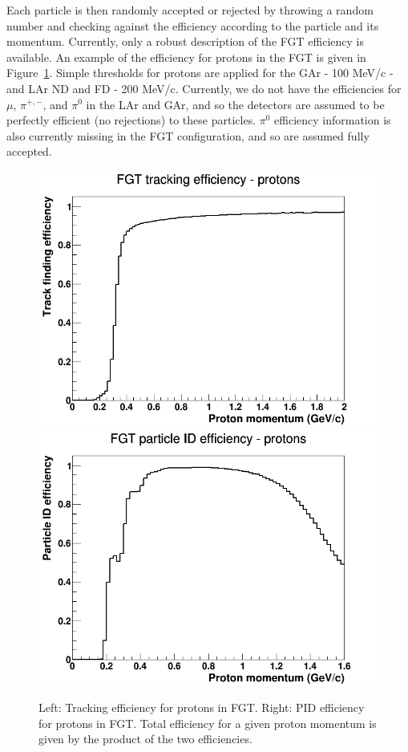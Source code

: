 \documentclass[12pt]{article}
\begin{document}
\FloatBarrier

Each particle is then randomly accepted or rejected by throwing a random number and checking against the efficiency according to the particle and its momentum. Currently, only a robust description of the FGT efficiency is available. An example of the efficiency for protons in the FGT is given in Figure~\ref{fig:FGT_proton_effs}. Simple thresholds for protons are applied for the GAr - 100 MeV/c - and LAr ND and FD - 200 MeV/c. Currently, we do not have the efficiencies for $\mu$, $\pi^{+,-}$, and $\pi^{0}$ in the LAr and GAr, and so the detectors are assumed to be perfectly efficient (no rejections) to these particles. $\pi^0$ efficiency information is also currently missing in the FGT configuration, and so are assumed fully accepted.
\begin{figure}[h]
\centering
{}
\includegraphics[width=\linewidth]{eff_plots/fgt_trkeff_proton.png}
\endminipage
{}
\includegraphics[width=\linewidth]{eff_plots/fgt_pideff_proton.png}
\endminipage
\caption{Left: Tracking efficiency for protons in FGT. Right: PID efficiency for protons in FGT. Total efficiency for a given proton momentum is given by the product of the two efficiencies.}
\label{fig:FGT_proton_effs}
\end{figure}
\end{document}
